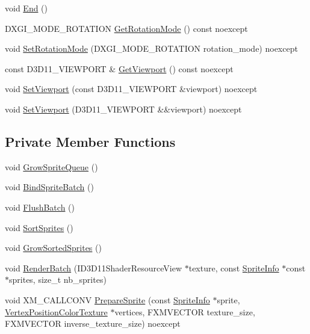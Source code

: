 \begin{DoxyCompactItemize}
\item 
void \hyperlink{classmage_1_1_sprite_batch_a9764372bb18b1c24a4a2f64ab0649569}{End} ()
\item 
D\+X\+G\+I\+\_\+\+M\+O\+D\+E\+\_\+\+R\+O\+T\+A\+T\+I\+ON \hyperlink{classmage_1_1_sprite_batch_ae38132bcf084f268dae7bfcc3b9c9a4d}{Get\+Rotation\+Mode} () const noexcept
\item 
void \hyperlink{classmage_1_1_sprite_batch_a59ec5e96a62bcd674cbf0d22f152b17f}{Set\+Rotation\+Mode} (D\+X\+G\+I\+\_\+\+M\+O\+D\+E\+\_\+\+R\+O\+T\+A\+T\+I\+ON rotation\+\_\+mode) noexcept
\item 
const D3\+D11\+\_\+\+V\+I\+E\+W\+P\+O\+RT \& \hyperlink{classmage_1_1_sprite_batch_ab4f95db776d7c20896f9420bc60d90c8}{Get\+Viewport} () const noexcept
\item 
void \hyperlink{classmage_1_1_sprite_batch_a5b02194c2bdbbe5b04e95ab401e6de4e}{Set\+Viewport} (const D3\+D11\+\_\+\+V\+I\+E\+W\+P\+O\+RT \&viewport) noexcept
\item 
void \hyperlink{classmage_1_1_sprite_batch_aef86940ffc869785fb8ff8eb85ab7b46}{Set\+Viewport} (D3\+D11\+\_\+\+V\+I\+E\+W\+P\+O\+RT \&\&viewport) noexcept
\end{DoxyCompactItemize}
\subsection*{Private Member Functions}
\begin{DoxyCompactItemize}
\item 
void \hyperlink{classmage_1_1_sprite_batch_a7e12144793e4a69c2f9eb7aea9326049}{Grow\+Sprite\+Queue} ()
\item 
void \hyperlink{classmage_1_1_sprite_batch_ae37c48045926d4758b6c701c06be64de}{Bind\+Sprite\+Batch} ()
\item 
void \hyperlink{classmage_1_1_sprite_batch_a352714b5d02590245ab8ffe8489305f7}{Flush\+Batch} ()
\item 
void \hyperlink{classmage_1_1_sprite_batch_af7a5d406b02cd477c9b80eae9984aa86}{Sort\+Sprites} ()
\item 
void \hyperlink{classmage_1_1_sprite_batch_ae403aa1afdd7df1f67bfd98ced8e76a4}{Grow\+Sorted\+Sprites} ()
\item 
void \hyperlink{classmage_1_1_sprite_batch_a37356dc0119bcc4237ca9d05a40628e7}{Render\+Batch} (I\+D3\+D11\+Shader\+Resource\+View $\ast$texture, const \hyperlink{structmage_1_1_sprite_info}{Sprite\+Info} $\ast$const $\ast$sprites, size\+\_\+t nb\+\_\+sprites)
\item 
void X\+M\+\_\+\+C\+A\+L\+L\+C\+O\+NV \hyperlink{classmage_1_1_sprite_batch_ade27cb47058823566f360356c1e245ec}{Prepare\+Sprite} (const \hyperlink{structmage_1_1_sprite_info}{Sprite\+Info} $\ast$sprite, \hyperlink{structmage_1_1_vertex_position_color_texture}{Vertex\+Position\+Color\+Texture} $\ast$vertices, F\+X\+M\+V\+E\+C\+T\+OR texture\+\_\+size, F\+X\+M\+V\+E\+C\+T\+OR inverse\+\_\+texture\+\_\+size) noexcept
\end{DoxyCompactItemize}
